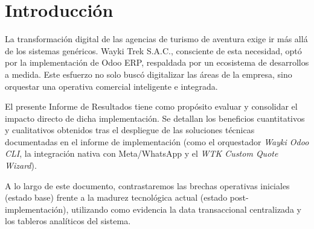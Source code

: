 \section{Introducción}

La transformación digital de las agencias de turismo de aventura exige ir más allá de los sistemas genéricos. Wayki Trek S.A.C., consciente de esta necesidad, optó por la implementación de Odoo ERP, respaldada por un ecosistema de desarrollos a medida. Este esfuerzo no solo buscó digitalizar las áreas de la empresa, sino orquestar una operativa comercial inteligente e integrada.

El presente Informe de Resultados tiene como propósito evaluar y consolidar el impacto directo de dicha implementación. Se detallan los beneficios cuantitativos y cualitativos obtenidos tras el despliegue de las soluciones técnicas documentadas en el informe de implementación (como el orquestador \textit{Wayki Odoo CLI}, la integración nativa con Meta/WhatsApp y el \textit{WTK Custom Quote Wizard}).

A lo largo de este documento, contrastaremos las brechas operativas iniciales (estado base) frente a la madurez tecnológica actual (estado post-implementación), utilizando como evidencia la data transaccional centralizada y los tableros analíticos del sistema.
